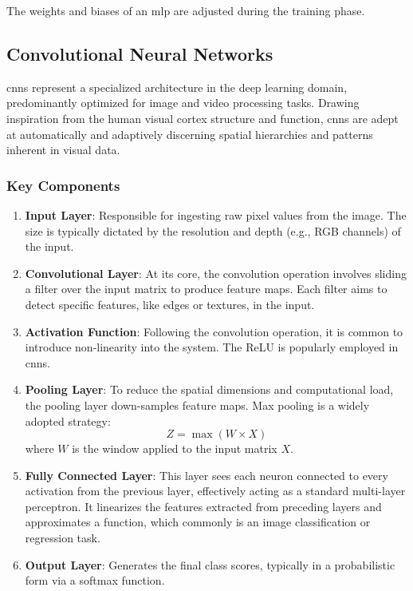 The weights and biases of an \gls{mlp} are adjusted during the training phase.


\subsection{Convolutional Neural Networks}

\glspl{cnn} represent a specialized architecture in the deep learning domain, predominantly optimized for image and video processing tasks. Drawing inspiration from the human visual cortex structure and function, \glspl{cnn} are adept at automatically and adaptively discerning spatial hierarchies and patterns inherent in visual data.

\subsubsection{Key Components}

\begin{enumerate}
	\item \textbf{Input Layer}: Responsible for ingesting raw pixel values from the image. The size is typically dictated by the resolution and depth (e.g., RGB channels) of the input.
	
	\item \textbf{Convolutional Layer}: At its core, the convolution operation involves sliding a filter over the input matrix to produce feature maps. Each filter aims to detect specific features, like edges or textures, in the input.
	
	\item \textbf{Activation Function}: Following the convolution operation, it is common to introduce non-linearity into the system. The ReLU is popularly employed in \glspl{cnn}.
	
	\item \textbf{Pooling Layer}: To reduce the spatial dimensions and computational load, the pooling layer down-samples feature maps. Max pooling is a widely adopted strategy:
	\begin{equation}
	Z = \max(W \times X)
	\end{equation}
	where \(W\) is the window applied to the input matrix \(X\).
	
	\item \textbf{Fully Connected Layer}: This layer sees each neuron connected to every activation from the previous layer, effectively acting as a standard multi-layer perceptron. It linearizes the features extracted from preceding layers and approximates a function, which commonly is an image classification or regression task.
	
	\item \textbf{Output Layer}: Generates the final class scores, typically in a probabilistic form via a softmax function.
\end{enumerate}

